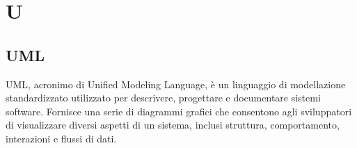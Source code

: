 \section*{U} 
\subsection*{UML} 
UML, acronimo di Unified Modeling Language, è un linguaggio di modellazione standardizzato utilizzato per descrivere, progettare e documentare sistemi software. Fornisce una serie di diagrammi grafici che consentono agli sviluppatori di visualizzare diversi aspetti di un sistema, inclusi struttura, comportamento, interazioni e flussi di dati. 
